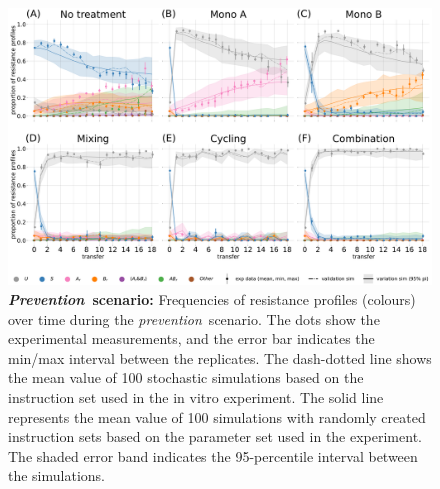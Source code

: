 \begin{figure}[p]
  \vspace{5cm}
  \centering
  \includegraphics[width=\linewidth]{chapter_2_sup/figures/20210417_timeplot.pdf}
  \caption{\textbf{\textit{Prevention}~scenario:}
    Frequencies of resistance profiles (colours) over time during the \textit{prevention}~scenario.
    The dots show the experimental measurements, and the error bar indicates the min/max interval between the replicates.
    The dash-dotted line shows the mean value of 100 stochastic simulations based on the instruction set used in the in vitro experiment.
    The solid line represents the mean value of 100 simulations with randomly created instruction sets based on the parameter set used in the experiment.
  The shaded error band indicates the 95-percentile interval between the simulations.}
  \label{fig:exp1}
\end{figure}

